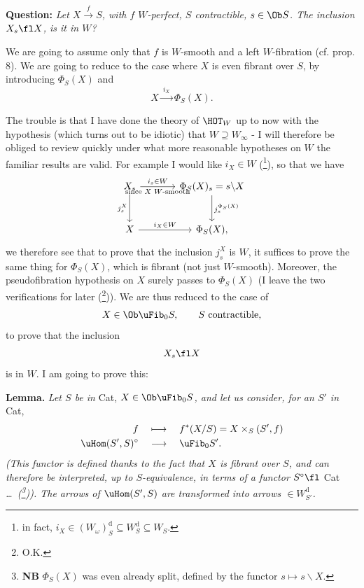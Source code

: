 \textbf{Question:} \textit{Let $X\xrightarrow{\ f\ }S$, with $f$ $W$-perfect, $S$ contractible, $s\in\Ob S$. The inclusion $X_s\fl X$, is it in $W$?}

We are going to assume only that $f$ is $W$-smooth and a left $W$-fibration (cf. prop. 8). We are going to reduce to the case where $X$ is even fibrant over $S$, by introducing $\Phi_S(X)$ and %
\[ X\xrightarrow{\ i_X\ }\Phi_S(X). \]

The trouble is that I have done the theory of $\HOT_W$ up to now with the hypothesis (which turns out to be idiotic) that $W\supseteq W_\infty$ - I will therefore be obliged to review quickly under what more reasonable hypotheses on $W$ the familiar results are valid. For example I would like $i_X\in W$ (\footnote[50]{in fact, $i_X\in(W_\omega)^{\mathrm{d}}_S\subseteq W^{\mathrm{d}}_S\subseteq W_S$.}), so that we have
\[
\begin{tikzcd}[column sep=large, row sep=large]
X_s \arrow[r, "i_s\in W", "\text{since $X$ $W$-smooth}"'] \arrow[d, "j^X_s"'] & \Phi_S(X)_s=s\backslash X \arrow[d, "j_s^{\Phi_S(X)}"] \\
X \arrow[r, "i_X\in W"] & \Phi_S(X),
\end{tikzcd}
\]
we therefore see that to prove that the inclusion $j^X_s$ is $W$, it suffices to prove the same thing for $\Phi_S(X)$, which is fibrant (not just $W$-smooth). Moreover, the pseudofibration hypothesis on $X$ surely passes to $\Phi_S(X)$ (I leave the two verifications for later (\footnote[51]{O.K.})). We are thus reduced to the case of
\[ X\in\Ob\uFib_0S, \qquad S\text{ contractible,} \]
to prove that the inclusion
\[ X_s\fl X \]
is in $W$. I am going to prove this:

\textbf{Lemma.} \textit{Let $S$ be in} Cat, \textit{$X\in\Ob\uFib_0S$, and let us consider, for an $S'$ in} Cat,
\[
\begin{aligned}
f &\quad\longmapsto\quad f^*(X/S)=X\times_S(S',f)\\
\uHom(S',S)^{\circ} &\quad\longrightarrow\quad \uFib_0S'.
\end{aligned}
\]
\textit{(This functor is defined thanks to the fact that $X$ is fibrant over $S$, and can therefore be interpreted, up to $S$-equivalence, in terms of a functor $S^{\circ}\fl$} Cat \textit{\dots\ (\footnote[52]{\textbf{NB} $\Phi_S(X)$ was even already split, defined by the functor $s\longmapsto s\backslash X$.})). The arrows of $\uHom(S',S)$ are transformed into arrows $\in W^{\mathrm{d}}_{S'}$.}

